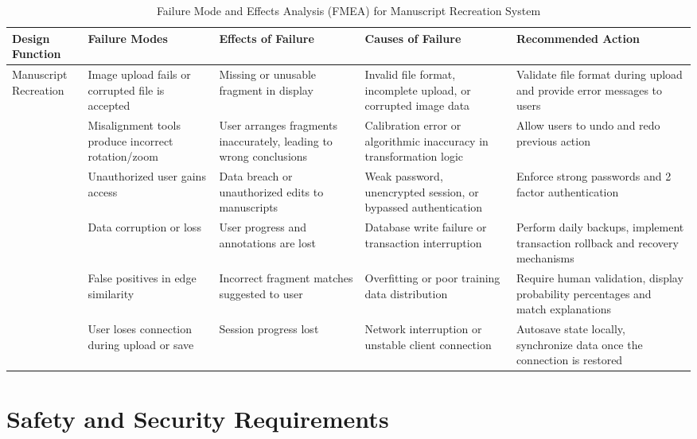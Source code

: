 \documentclass{article}
\begin{document}
\begin{table}[htbp]
\centering
\scriptsize
\caption{Failure Mode and Effects Analysis (FMEA) for Manuscript Recreation System}
\begin{tabularx}{\textwidth}{p{2.5cm} X X X X}
\toprule
\textbf{Design Function} & \textbf{Failure Modes} & \textbf{Effects of Failure} & \textbf{Causes of Failure} & \textbf{Recommended Action} \\
\midrule

\multirow{7}{*}{\parbox[t]{2cm}{Manuscript \\ Recreation}}
& Image upload fails or corrupted file is accepted 
& Missing or unusable fragment in display
& Invalid file format, incomplete upload, or corrupted image data 
& Validate file format during upload and provide error messages to users \\

& Misalignment tools produce incorrect rotation/zoom 
& User arranges fragments inaccurately, leading to wrong conclusions 
& Calibration error or algorithmic inaccuracy in transformation logic 
& Allow users to undo and redo previous action \\

& Unauthorized user gains access 
& Data breach or unauthorized edits to manuscripts 
& Weak password, unencrypted session, or bypassed authentication 
& Enforce strong passwords and 2 factor authentication \\

& Data corruption or loss 
& User progress and annotations are lost 
& Database write failure or transaction interruption 
& Perform daily backups, implement transaction rollback and recovery mechanisms \\

& False positives in edge similarity 
& Incorrect fragment matches suggested to user 
& Overfitting or poor training data distribution 
& Require human validation, display probability percentages and match explanations \\

& User loses connection during upload or save 
& Session progress lost 
& Network interruption or unstable client connection 
& Autosave state locally, synchronize data once the connection is restored \\

\bottomrule
\end{tabularx}
\end{table}

\section{Safety and Security Requirements}
\end{document}
